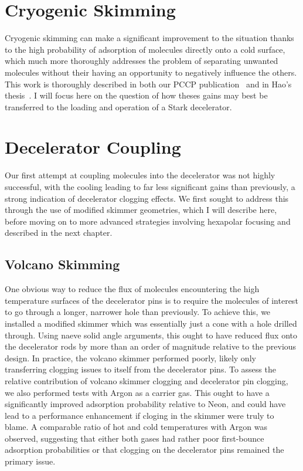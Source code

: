 \section{Cryogenic Skimming}

Cryogenic skimming can make a significant improvement to the situation thanks to the high probability of adsorption of molecules directly onto a cold surface, which much more thoroughly addresses the problem of separating unwanted molecules without their having an opportunity to negatively influence the others.
This work is thoroughly described in both our PCCP publication~\cite{Wu2018} and in Hao's thesis~\citep[Chap.~5]{WuThesis2019}.
I will focus here on the question of how theses gains may best be transferred to the loading and operation of a Stark decelerator.

\section{Decelerator Coupling}

Our first attempt at coupling molecules into the decelerator was not highly successful, with the cooling leading to far less significant gains than previously, a strong indication of decelerator clogging effects.
We first sought to address this through the use of modified skimmer geometries, which I will describe here, before moving on to more advanced strategies involving hexapolar focusing and described in the next chapter.

\subsection{Volcano Skimming}

One obvious way to reduce the flux of molecules encountering the high temperature surfaces of the decelerator pins is to require the molecules of interest to go through a longer, narrower hole than previously.
To achieve this, we installed a modified skimmer which was essentially just a cone with a hole drilled through.
Using naeve solid angle arguments, this ought to have reduced flux onto the decelerator rods by more than an order of magnitude relative to the previous design.
In practice, the volcano skimmer performed poorly, likely only transferring clogging issues to itself from the decelerator pins.
To assess the relative contribution of volcano skimmer clogging and decelerator pin clogging, we also performed tests with Argon as a carrier gas.
This ought to have a significantly improved adsorption probability relative to Neon, and could have lead to a performance enhancement if cloging in the skimmer were truly to blame.
A comparable ratio of hot and cold temperatures with Argon was observed, suggesting that either both gases had rather poor first-bounce adsorption probabilities or that clogging on the decelerator pins remained the primary issue.

